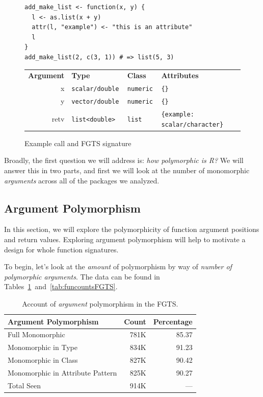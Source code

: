 \documentclass[acmsmall,10pt,review,anonymous]{acmart}\settopmatter{printfolios=true,printccs=false,printacmref=false}
\begin{document}
\begin{figure}[!hb]{\small\begin{lstlisting}[style=R]
add_make_list <- function(x, y) {
  l <- as.list(x + y)
  attr(l, "example") <- "this is an attribute"
  l
}
add_make_list(2, c(3, 1)) # => list(5, 3)
\end{lstlisting}}
\begin{tabular}{@{}r|l|l|l@{}}\hline
\bf Argument & \bf Type & \bf Class &\bf Attributes \\
x & \tt scalar/double & \tt numeric & \tt \{\} \\
y & \tt vector/double & \tt numeric & \tt \{\} \\
retv & \tt list<double> & \tt list & \tt \{example: scalar/character\}  
\end{tabular}
\caption{Example call and FGTS signature}\label{fig:exFGTS}\end{figure}

Broadly, the first question we will address is: {\it how polymorphic is R?} 
We will answer this in two parts, and first we will look at the number of monomorphic {\it arguments} across all of the packages we analyzed.  

%
%
%
%
\subsection{Argument Polymorphism}

In this section, we will explore the polymorphicity of function argument positions and return values.
Exploring argument polymorphism will help to motivate a design for whole function signatures.

To begin, let's look at the {\it amount} of polymorphism by way of {\it number of polymorphic arguments}.
The data can be found in Tables~\ref{tab:argcountsFGTS}~and~\ref{tab:funcountsFGTS}.

\begin{table}[ht]
\label{tab:argcountsFGTS}
\centering
\begin{tabular}{lrr}
  \hline
 Argument Polymorphism & Count & Percentage \\ 
  \hline
  Full Monomorphic & 781K & 85.37 \\ 
  Monomorphic in Type & 834K & 91.23 \\ 
  Monomorphic in Class & 827K & 90.42 \\ 
  Monomorphic in Attribute Pattern & 825K & 90.27 \\ 
  Total Seen & 914K & --- \\ 
     \hline
\end{tabular}
\caption{Account of {\it argument} polymorphism in the FGTS.}
\end{table}
\end{document}
